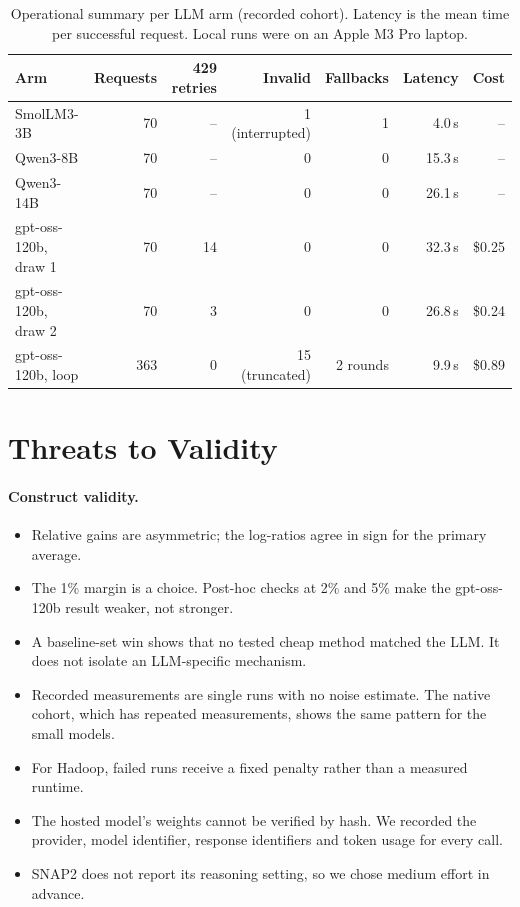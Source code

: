 \begin{table}[t]
\centering
\caption{Operational summary per LLM arm (recorded cohort). Latency is the mean time per successful request. Local runs were on an Apple M3 Pro laptop.}
\label{tab:ops}
\small
\setlength{\tabcolsep}{4pt}
\begin{tabular}{lrrrrrr}
\toprule
Arm & Requests & 429 retries & Invalid & Fallbacks & Latency & Cost \\
\midrule
SmolLM3-3B & 70 & -- & 1 (interrupted) & 1 & 4.0\,s & -- \\
Qwen3-8B & 70 & -- & 0 & 0 & 15.3\,s & -- \\
Qwen3-14B & 70 & -- & 0 & 0 & 26.1\,s & -- \\
gpt-oss-120b, draw 1 & 70 & 14 & 0 & 0 & 32.3\,s & \$0.25 \\
gpt-oss-120b, draw 2 & 70 & 3 & 0 & 0 & 26.8\,s & \$0.24 \\
gpt-oss-120b, loop & 363 & 0 & 15 (truncated) & 2 rounds & 9.9\,s & \$0.89 \\
\bottomrule
\end{tabular}
\end{table}

\section{Threats to Validity}

\paragraph{Construct validity.}
\begin{itemize}
  \item Relative gains are asymmetric; the log-ratios agree in sign for the primary average.
  \item The 1\% margin is a choice. Post-hoc checks at 2\% and 5\% make the gpt-oss-120b result weaker, not stronger.
  \item A baseline-set win shows that no tested cheap method matched the LLM. It does not isolate an LLM-specific mechanism.
  \item Recorded measurements are single runs with no noise estimate. The native cohort, which has repeated measurements, shows the same pattern for the small models.
  \item For Hadoop, failed runs receive a fixed penalty rather than a measured runtime.
  \item The hosted model's weights cannot be verified by hash. We recorded the provider, model identifier, response identifiers and token usage for every call.
  \item SNAP2 does not report its reasoning setting, so we chose medium effort in advance.
\end{itemize}


